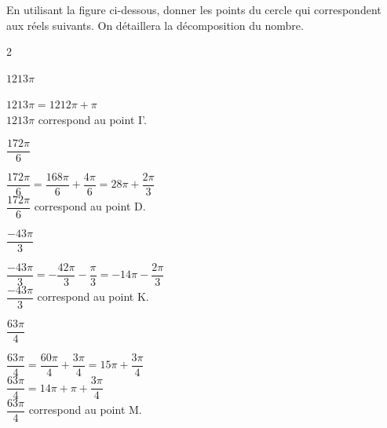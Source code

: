 \documentclass[a4paper,12pt]{article}        %
\begin{document}
En utilisant la figure ci-dessous, donner les points du cercle qui correspondent aux réels suivants. On détaillera la décomposition du nombre.
\begin{multicols}{2}
\begin{enumMet}
    \item $1213\pi$\\
    \begin{corrBox}
        $1213\pi=1212\pi+\pi$\\ 
        $1213\pi$ correspond au point I'.
    \end{corrBox}
    \item $\dfrac{172\pi}{6}$\\
    \begin{corrBox}
        $\dfrac{172\pi}{6}=\dfrac{168\pi}{6}+\dfrac{4\pi}{6}=28\pi+\dfrac{2\pi}{3}$\\
        $\dfrac{172\pi}{6}$ correspond au point D.
    \end{corrBox}
    \columnbreak
    \item $\dfrac{-43\pi}{3}$\\
    \begin{corrBox}
        $\dfrac{-43\pi}{3}=-\dfrac{42\pi}{3}-\dfrac{\pi}{3}=-14\pi-\dfrac{2\pi}{3}$\\
        $\dfrac{-43\pi}{3}$ correspond au point K.
    \end{corrBox}
    \item $\dfrac{63\pi}{4}$\\
    \begin{corrBox}
        $\dfrac{63\pi}{4}=\dfrac{60\pi}{4}+\dfrac{3\pi}{4}=15\pi+\dfrac{3\pi}{4}$\\
        $\dfrac{63\pi}{4}=14\pi+\pi+\dfrac{3\pi}{4}$\\
        $\dfrac{63\pi}{4}$ correspond au point M.
    \end{corrBox}
\end{enumMet}
\end{multicols}
\end{document}
